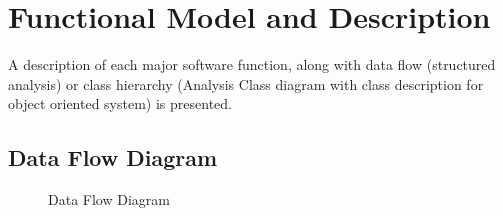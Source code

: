 \documentclass[oneside,a4paper,12pt]{report}
\begin{document}
 
\section{Functional Model and Description}  
A description of each major software function, along with data flow (structured analysis) or class hierarchy (Analysis Class diagram with class description for object oriented system) is presented. 

\subsection{Data Flow Diagram}  
\begin{center}
	\begin{figure}[H]
		\centering
	  \caption{Data Flow Diagram}
	  \label{fig:data-flow}
	\end{figure}
\end{center} 
 
 
\end{document}

